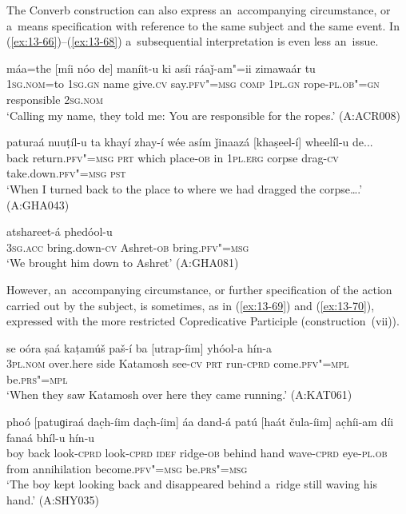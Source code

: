  The Converb construction can also express an~accompanying circumstance, or a~means specification with reference to the same subject and the same event. In (\ref{ex:13-66})--(\ref{ex:13-68}) a~subsequential interpretation is even less an~issue.

\begin{exe}
\ex
\label{ex:13-66}
\gll máa=the [míi nóo de] maníit-u ki asíi ráaǰ-am"=ii zimawaár tu  \\
\textsc{1sg.nom}=to \textsc{1sg.gn} name give.\textsc{cv} say.\textsc{pfv"=msg} \textsc{comp}  \textsc{1pl.gn} rope-\textsc{pl.ob"=gn} responsible \textsc{2sg.nom}  \\
\glt `Calling my name, they told me: You are responsible for the ropes.' (A:ACR008)

\ex
\label{ex:13-67}
\gll paturaá nuuṭíl-u ta khayí zhay-í wée asím ǰinaazá [khaṣeel-í] wheelíl-u de... \\
back return.\textsc{pfv"=msg} \textsc{prt} which place-\textsc{ob} in \textsc{1pl.erg}  corpse drag-\textsc{cv} take.down.\textsc{pfv"=msg} \textsc{pst} \\
\glt `When I turned back to the place to where we had dragged the corpse{\ldots}.' (A:GHA043)

\ex
\label{ex:13-68}
 atshareet-á phedóol-u \\
\textsc{3sg.acc} bring.down-\textsc{cv} Ashret-\textsc{ob} bring.\textsc{pfv"=msg} \\
\glt `We brought him down to Ashret' (A:GHA081) 
\end{exe}

However, an~accompanying circumstance, or further specification of the action carried out by the subject, is sometimes, as in (\ref{ex:13-69}) and (\ref{ex:13-70}), expressed with the more restricted Copredicative Participle (construction~(vii)).

\begin{exe}
\ex
\label{ex:13-69}
\gll se oóra ṣaá kaṭamúš paš-í ba [utrap-íim] yhóol-a hín-a \\
\textsc{3pl.nom} over.here side Katamosh see-\textsc{cv} \textsc{prt} run-\textsc{cprd} come.\textsc{pfv"=mpl} be.\textsc{prs"=mpl} \\
\glt `When they saw Katamosh over here they came running.' (A:KAT061)

\ex
\label{ex:13-70}
\gll phoó [patuɡiraá dac̣h-íim dac̣h-íim] áa dand-á patú [haát čula-íim] ac̣híi-am díi fanaá bhíl-u hín-u \\
boy back look-\textsc{cprd} look-\textsc{cprd} \textsc{idef}  ridge-\textsc{ob} behind hand wave-\textsc{cprd} eye-\textsc{pl.ob} from  annihilation become.\textsc{pfv"=msg} be.\textsc{prs"=msg} \\
\glt `The boy kept looking back and disappeared behind a~ridge still waving his hand.' (A:SHY035) 
\end{exe}

